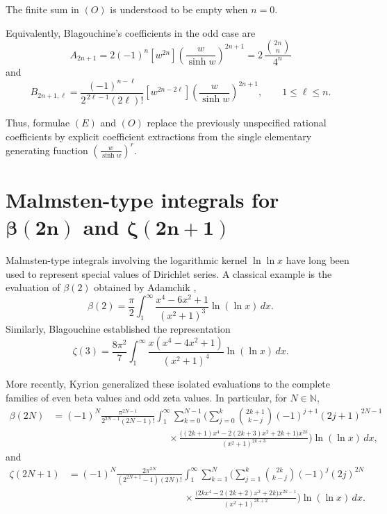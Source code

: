 \documentclass[11pt,twoside]{article}
\numberwithin{equation}{section}
\begin{document}
The finite sum in \((O)\) is understood to be empty when \(n=0\).

Equivalently, Blagouchine's coefficients in the odd case are
\[
\boxed{
A_{2n+1}
=
2(-1)^n
[w^{2n}]
\left(\frac{w}{\sinh w}\right)^{2n+1}=
2\,\frac{\binom{2n}{n}}{4^n}
}
\]
and
\[
\boxed{
B_{2n+1,\ell}
=
\frac{
(-1)^{n-\ell}
}{
2^{\,2\ell-1}(2\ell)!
}
[w^{2n-2\ell}]
\left(\frac{w}{\sinh w}\right)^{2n+1},
\qquad
1\leq \ell\leq n.
}
\]

Thus, formulae \((E)\) and \((O)\) replace the previously unspecified
rational coefficients by explicit coefficient extractions from the
single elementary generating function
\(\displaystyle
\left(\frac{w}{\sinh w}\right)^r.
\)

\section{Malmsten-type integrals for $\boldsymbol{\beta(2n)}$ and
$\boldsymbol{\zeta(2n+1)}$}
\label{sec:Malmsten-integrals}

Malmsten-type integrals involving the logarithmic kernel
$\ln\ln x$ have long been used to represent special values of
Dirichlet series. A classical example is the evaluation of
$\beta(2)$ obtained by Adamchik \cite{Adamchik1997},
\begin{equation}\label{eq:Adamchik-beta2}
\beta(2)
=
\frac{\pi}{2}
\int_{1}^{\infty}
\frac{x^{4}-6x^{2}+1}{(x^{2}+1)^{3}}
\ln(\ln x)\,dx.
\end{equation}
Similarly, Blagouchine \cite{Blagouchine2014} established the
representation
\begin{equation}\label{eq:Blagouchine-zeta3}
\zeta(3)
=
\frac{8\pi^{2}}{7}
\int_{1}^{\infty}
\frac{x(x^{4}-4x^{2}+1)}{(x^{2}+1)^{4}}
\ln(\ln x)\,dx.
\end{equation}

More recently, Kyrion \cite{Kyrion2025} generalized these isolated
evaluations to the complete families of even beta values and odd
zeta values. In particular, for $N\in\mathbb N$,
\begin{align}
\beta(2N)
&=
(-1)^{N}
\frac{\pi^{2N-1}}
     {2^{2N-1}(2N-1)!}
\int_{1}^{\infty}
\sum_{k=0}^{N-1}
\Bigg(
\sum_{j=0}^{k}
\binom{2k+1}{k-j}
(-1)^{j+1}(2j+1)^{2N-1}
\nonumber\\
&\hspace{5cm}\times
\frac{
\bigl((2k+1)x^{4}-2(2k+3)x^{2}+2k+1\bigr)x^{2k}
}
{(x^{2}+1)^{2k+3}}
\Bigg)
\ln(\ln x)\,dx,
\label{eq:Kyrion-beta}
\end{align}
and
\begin{align}
\zeta(2N+1)
&=
(-1)^{N}
\frac{2\pi^{2N}}
     {(2^{2N+1}-1)(2N)!}
\int_{1}^{\infty}
\sum_{k=1}^{N}
\Bigg(
\sum_{j=1}^{k}
\binom{2k}{k-j}
(-1)^{j}(2j)^{2N}
\nonumber\\
&\hspace{5cm}\times
\frac{
\bigl(2kx^{4}-2(2k+2)x^{2}+2k\bigr)x^{2k-1}
}
{(x^{2}+1)^{2k+2}}
\Bigg)
\ln(\ln x)\,dx.
\label{eq:Kyrion-zeta}
\end{align}
\end{document}
